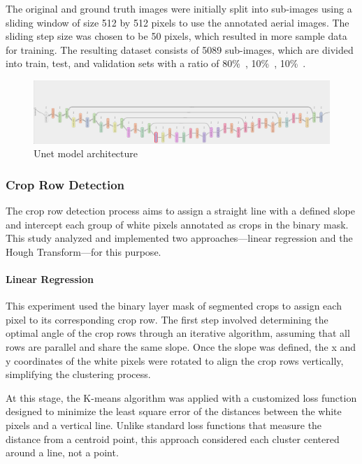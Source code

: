 \documentclass[conference]{IEEEtran}
\begin{document}
	The original and ground truth images were initially split into sub-images using a sliding window of size 512 by 512 pixels to use the annotated aerial images. The sliding step size was chosen to be 50 pixels, which resulted in more sample data for training. The resulting dataset consists of 5089 sub-images, which are divided into train, test, and validation sets with a ratio of 80\%\
	, 10\%\
	, 10\%\
	.
	
	
	\begin{figure}[t]
		\includegraphics[width=\linewidth]{UNET.png}
		\caption{Unet model architecture}
		\label{fig_Unet}
	\end{figure}
	
	\subsubsection{Crop Row Detection}\label{Crop Row Detection}\leavevmode
	
	The crop row detection process aims to assign a straight line with a defined slope and intercept each group of white pixels annotated as crops in the binary mask. This study analyzed and implemented two approaches—linear regression and the Hough Transform—for this purpose.
	
	\paragraph{Linear Regression}\label{Linear Regression}\leavevmode
	
	This experiment used the binary layer mask of segmented crops to assign each pixel to its corresponding crop row. The first step involved determining the optimal angle of the crop rows through an iterative algorithm, assuming that all rows are parallel and share the same slope. Once the slope was defined, the x and y coordinates of the white pixels were rotated to align the crop rows vertically, simplifying the clustering process.
	
	At this stage, the K-means algorithm was applied with a customized loss function designed to minimize the least square error of the distances between the white pixels and a vertical line. Unlike standard loss functions that measure the distance from a centroid point, this approach considered each cluster centered around a line, not a point.
	
\end{document}
